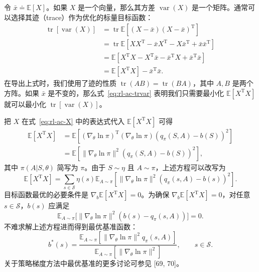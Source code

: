 \begin{derivation}\label{box:rl-ac-optbaseline}
令 $\bar{x} \doteq \mathbb{E}[X]$。如果 $X$ 是一个向量，那么其方差 $\operatorname{var}(X)$ 是一个矩阵。通常可以选择其迹（trace）作为优化的标量目标函数：
\begin{equation}
\begin{aligned}
\operatorname{tr}[\operatorname{var}(X)] &= \operatorname{tr} \mathbb{E}[(X - \bar{x})(X - \bar{x})^{\mathrm{T}}] \\
&= \operatorname{tr} \mathbb{E}[X X^{\mathrm{T}} - \bar{x} X^{\mathrm{T}} - X \bar{x}^{\mathrm{T}} + \bar{x} \bar{x}^{\mathrm{T}}] \\
&= \mathbb{E}[X^{\mathrm{T}} X - X^{\mathrm{T}} \bar{x} - \bar{x}^{\mathrm{T}} X + \bar{x}^{\mathrm{T}} \bar{x}] \\
&= \mathbb{E}[X^{\mathrm{T}} X] - \bar{x}^{\mathrm{T}} \bar{x}.
\end{aligned}
\label{eq:rl-ac-trvar}
\end{equation}
在导出上式时，我们使用了迹的性质 $\operatorname{tr}(AB) = \operatorname{tr}(BA)$，其中 $A, B$ 是两个方阵。如果 $\bar{x}$ 是不变的，那么式~\eqref{eq:rl-ac-trvar} 表明我们只需要最小化 $\mathbb{E}[X^{\mathrm{T}} X]$ 就可以最小化 $\operatorname{tr}[\operatorname{var}(X)]$。

把 $X$ 在式~\eqref{eq:rl-ac-X} 中的表达式代入 $\mathbb{E}[X^{\mathrm{T}} X]$ 可得
\[
\begin{aligned}
\mathbb{E}[X^{\mathrm{T}} X] &= \mathbb{E} \left[ (\nabla_{\theta} \ln \pi)^{\mathrm{T}} (\nabla_{\theta} \ln \pi) (q_{\pi}(S, A) - b(S))^{2} \right] \\
&= \mathbb{E} \left[ \| \nabla_{\theta} \ln \pi \|^{2} (q_{\pi}(S, A) - b(S))^{2} \right],
\end{aligned}
\]
其中 $\pi(A | S, \theta)$ 简写为 $\pi$。由于 $S \sim \eta$ 且 $A \sim \pi$，上述方程可以改写为
\[
\mathbb{E}[X^{\mathrm{T}} X] = \sum_{s \in \mathcal{S}} \eta(s) \mathbb{E}_{A \sim \pi} \left[ \| \nabla_{\theta} \ln \pi \|^{2} (q_{\pi}(s, A) - b(s))^{2} \right].
\]
目标函数最优的必要条件是 $\nabla_{b} \mathbb{E}[X^{\mathrm{T}} X] = 0$。为确保 $\nabla_{b} \mathbb{E}[X^{\mathrm{T}} X] = 0$，对任意 $s \in \mathcal{S}$，$b(s)$ 应满足
\[
\mathbb{E}_{A \sim \pi} \big[ \| \nabla_{\theta} \ln \pi \|^{2} (b(s) - q_{\pi}(s, A)) \big] = 0.
\]
不难求解上述方程进而得到最优基准函数：
\[
b^{*}(s) = \frac{\mathbb{E}_{A \sim \pi} [ \| \nabla_{\theta} \ln \pi \|^{2} q_{\pi}(s, A) ]}{\mathbb{E}_{A \sim \pi} [ \| \nabla_{\theta} \ln \pi \|^{2} ]}, \qquad s \in \mathcal{S}.
\]
关于策略梯度方法中最优基准的更多讨论可参见 [69, 70]。
\end{derivation}

